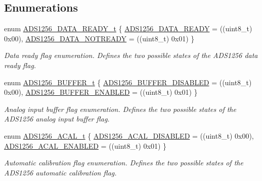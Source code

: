 \subsection*{Enumerations}
\begin{DoxyCompactItemize}
\item 
enum \hyperlink{group__ads1256__driver_gaf437774eb0db277a2916b6322213b449}{A\-D\-S1256\-\_\-\-D\-A\-T\-A\-\_\-\-R\-E\-A\-D\-Y\-\_\-t} \{ \hyperlink{group__ads1256__driver_ggaf437774eb0db277a2916b6322213b449a0487f4550f3178d69a29cde93e86918c}{A\-D\-S1256\-\_\-\-D\-A\-T\-A\-\_\-\-R\-E\-A\-D\-Y} = ((uint8\-\_\-t) 0x00), 
\hyperlink{group__ads1256__driver_ggaf437774eb0db277a2916b6322213b449a86cfc530dfe000eea81833322610a507}{A\-D\-S1256\-\_\-\-D\-A\-T\-A\-\_\-\-N\-O\-T\-R\-E\-A\-D\-Y} = ((uint8\-\_\-t) 0x01)
 \}
\begin{DoxyCompactList}\small\item\em Data ready flag enumeration. Defines the two possible states of the A\-D\-S1256 data ready flag. \end{DoxyCompactList}\item 
enum \hyperlink{group__ads1256__driver_ga12f71f8fc93fe63fb3c855ddd2070890}{A\-D\-S1256\-\_\-\-B\-U\-F\-F\-E\-R\-\_\-t} \{ \hyperlink{group__ads1256__driver_gga12f71f8fc93fe63fb3c855ddd2070890ab96fff9524e97e03826453e744f85e92}{A\-D\-S1256\-\_\-\-B\-U\-F\-F\-E\-R\-\_\-\-D\-I\-S\-A\-B\-L\-E\-D} = ((uint8\-\_\-t) 0x00), 
\hyperlink{group__ads1256__driver_gga12f71f8fc93fe63fb3c855ddd2070890a5e401084d351163377c60d8e4e2a50c1}{A\-D\-S1256\-\_\-\-B\-U\-F\-F\-E\-R\-\_\-\-E\-N\-A\-B\-L\-E\-D} = ((uint8\-\_\-t) 0x01)
 \}
\begin{DoxyCompactList}\small\item\em Analog input buffer flag enumeration. Defines the two possible states of the A\-D\-S1256 analog input buffer flag. \end{DoxyCompactList}\item 
enum \hyperlink{group__ads1256__driver_ga17864ca559c443a262068f0d19406113}{A\-D\-S1256\-\_\-\-A\-C\-A\-L\-\_\-t} \{ \hyperlink{group__ads1256__driver_gga17864ca559c443a262068f0d19406113a1d47eab8dbc92c3879643572738ab3fb}{A\-D\-S1256\-\_\-\-A\-C\-A\-L\-\_\-\-D\-I\-S\-A\-B\-L\-E\-D} = ((uint8\-\_\-t) 0x00), 
\hyperlink{group__ads1256__driver_gga17864ca559c443a262068f0d19406113a79c968fa3703df5e7e03262dad11fc77}{A\-D\-S1256\-\_\-\-A\-C\-A\-L\-\_\-\-E\-N\-A\-B\-L\-E\-D} = ((uint8\-\_\-t) 0x01)
 \}
\begin{DoxyCompactList}\small\item\em Automatic calibration flag enumeration. Defines the two possible states of the A\-D\-S1256 automatic calibration flag. \end{DoxyCompactList}\item 

\end{DoxyCompactItemize}
